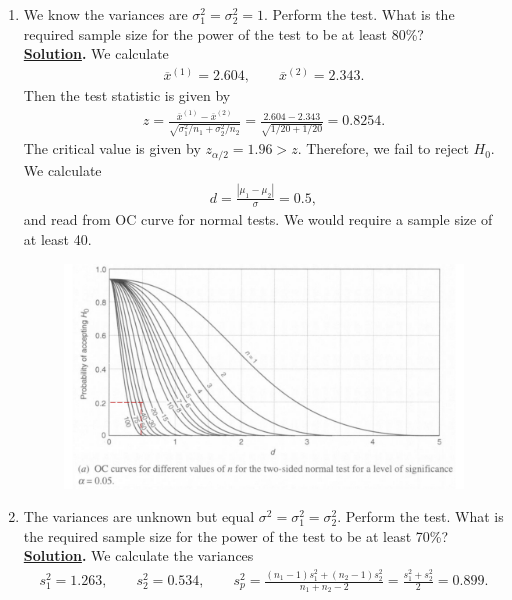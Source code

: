 \begin{enumerate}
	\item We know the variances are $\sigma_1^2 = \sigma_2^2 = 1$. Perform the test. What is the required sample size for the power of the test to be at least 80\%? \\
	\textbf{\underline{Solution}.} We calculate
	\begin{align*}
	\overline{x}^{(1)} = 2.604, \qquad \overline{x}^{(2)} = 2.343.
	\end{align*}
	Then the test statistic is given by
	\begin{align*}
	z = \frac{\overline{x}^{(1)} - \overline{x}^{(2)}}{\sqrt{\sigma_1^2/n_1 + \sigma_2^2/n_2}} = \frac{2.604 - 2.343}{\sqrt{1/20+1/20}} = 0.8254.
	\end{align*}
	The critical value is given by $z_{\alpha/2} = 1.96 > z$. Therefore, we fail to reject $H_0$. We calculate
	\begin{align*}
	d = \frac{|\mu_1-\mu_2|}{\sigma} = 0.5,
	\end{align*}
	and read from OC curve for normal tests. We would require a sample size of at least 40.
	\begin{figure}[H]
		\centering
		\includegraphics[width=\linewidth]{./images/s6fig1.pdf}
	\end{figure}
	\item The variances are unknown but equal $\sigma^2 = \sigma_1^2 = \sigma_2^2$. Perform the test. What is the required sample size for the power of the test to be at least 70\%? \\
	\textbf{\underline{Solution}.} We calculate the variances
	\begin{align*}
	s_1^2 = 1.263, \qquad s_2^2 = 0.534, \qquad s_p^2 = \frac{(n_1-1)s_1^2 + (n_2-1)s_2^2}{n_1+n_2-2} = \frac{s_1^2 + s_2^2}{2} = 0.899.
	\end{align*}

\end{enumerate}
